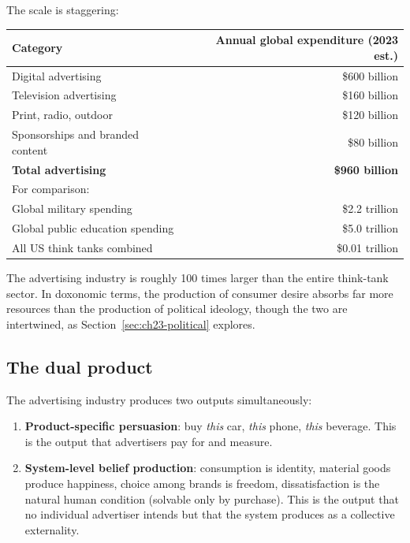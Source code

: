 The scale is staggering:

\begin{center}
\begin{tabular}{lr}
\toprule
Category & Annual global expenditure (2023 est.) \\
\midrule
Digital advertising & \$600 billion \\
Television advertising & \$160 billion \\
Print, radio, outdoor & \$120 billion \\
Sponsorships and branded content & \$80 billion \\
\midrule
\textbf{Total advertising} & \textbf{\$960 billion} \\
\midrule
For comparison: & \\
\quad Global military spending & \$2.2 trillion \\
\quad Global public education spending & \$5.0 trillion \\
\quad All US think tanks combined & \$0.01 trillion \\
\bottomrule
\end{tabular}
\end{center}

The advertising industry is roughly 100 times larger than the entire think-tank sector.
In doxonomic terms, the production of consumer desire absorbs far more resources than the production of political ideology, though the two are intertwined, as Section~\ref{sec:ch23-political} explores.

\subsection{The dual product}

The advertising industry produces two outputs simultaneously:
\begin{enumerate}
  \item \textbf{Product-specific persuasion}: buy \emph{this} car, \emph{this} phone, \emph{this} beverage.
  This is the output that advertisers pay for and measure.

  \item \textbf{System-level belief production}: consumption is identity, material goods produce happiness, choice among brands is freedom, dissatisfaction is the natural human condition (solvable only by purchase).
  This is the output that no individual advertiser intends but that the system produces as a collective externality.
\end{enumerate}

